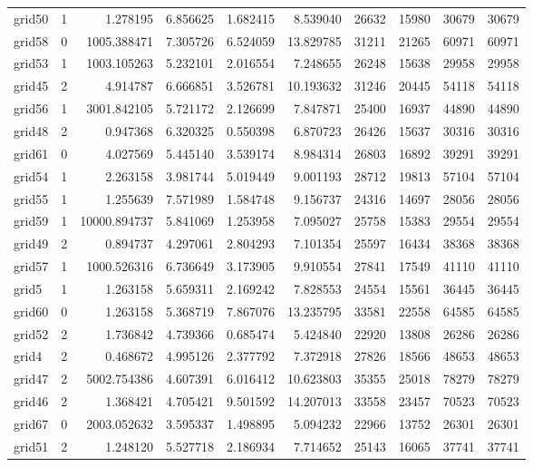\begin{longtable}{|l|r|r|r|r|r|r|r|r|r|}
grid50 & 1 & 1.278195 & 6.856625 & 1.682415 & 8.539040 & 26632 & 15980 & 30679 & 30679 \\
grid58 & 0 & 1005.388471 & 7.305726 & 6.524059 & 13.829785 & 31211 & 21265 & 60971 & 60971 \\
grid53 & 1 & 1003.105263 & 5.232101 & 2.016554 & 7.248655 & 26248 & 15638 & 29958 & 29958 \\
grid45 & 2 & 4.914787 & 6.666851 & 3.526781 & 10.193632 & 31246 & 20445 & 54118 & 54118 \\
grid56 & 1 & 3001.842105 & 5.721172 & 2.126699 & 7.847871 & 25400 & 16937 & 44890 & 44890 \\
grid48 & 2 & 0.947368 & 6.320325 & 0.550398 & 6.870723 & 26426 & 15637 & 30316 & 30316 \\
grid61 & 0 & 4.027569 & 5.445140 & 3.539174 & 8.984314 & 26803 & 16892 & 39291 & 39291 \\
grid54 & 1 & 2.263158 & 3.981744 & 5.019449 & 9.001193 & 28712 & 19813 & 57104 & 57104 \\
grid55 & 1 & 1.255639 & 7.571989 & 1.584748 & 9.156737 & 24316 & 14697 & 28056 & 28056 \\
grid59 & 1 & 10000.894737 & 5.841069 & 1.253958 & 7.095027 & 25758 & 15383 & 29554 & 29554 \\
grid49 & 2 & 0.894737 & 4.297061 & 2.804293 & 7.101354 & 25597 & 16434 & 38368 & 38368 \\
grid57 & 1 & 1000.526316 & 6.736649 & 3.173905 & 9.910554 & 27841 & 17549 & 41110 & 41110 \\
grid5 & 1 & 1.263158 & 5.659311 & 2.169242 & 7.828553 & 24554 & 15561 & 36445 & 36445 \\
grid60 & 0 & 1.263158 & 5.368719 & 7.867076 & 13.235795 & 33581 & 22558 & 64585 & 64585 \\
grid52 & 2 & 1.736842 & 4.739366 & 0.685474 & 5.424840 & 22920 & 13808 & 26286 & 26286 \\
grid4 & 2 & 0.468672 & 4.995126 & 2.377792 & 7.372918 & 27826 & 18566 & 48653 & 48653 \\
grid47 & 2 & 5002.754386 & 4.607391 & 6.016412 & 10.623803 & 35355 & 25018 & 78279 & 78279 \\
grid46 & 2 & 1.368421 & 4.705421 & 9.501592 & 14.207013 & 33558 & 23457 & 70523 & 70523 \\
grid67 & 0 & 2003.052632 & 3.595337 & 1.498895 & 5.094232 & 22966 & 13752 & 26301 & 26301 \\
grid51 & 2 & 1.248120 & 5.527718 & 2.186934 & 7.714652 & 25143 & 16065 & 37741 & 37741 \\

\end{longtable}
